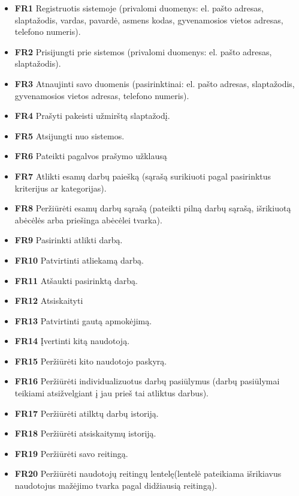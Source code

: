 \documentclass{VUMIFPSbakalaurinis}
\begin{document}
\begin{itemize}
	\item \textbf{FR1} Registruotis sistemoje (privalomi duomenys: el. pašto adresas, slaptažodis, vardas, pavardė, asmens kodas, gyvenamosios vietos adresas, telefono numeris).
	\item \textbf{FR2} Prisijungti prie sistemos (privalomi duomenys: el. pašto adresas, slaptažodis).
	\item \textbf{FR3} Atnaujinti savo duomenis (pasirinktinai: el. pašto adresas, slaptažodis, gyvenamosios vietos adresas, telefono numeris).
	\item \textbf{FR4} Prašyti pakeisti užmirštą slaptažodį.
	\item \textbf{FR5} Atsijungti nuo sistemos.
	\item \textbf{FR6} Pateikti pagalvos prašymo užklausą
	\item \textbf{FR7} Atlikti esamų darbų paiešką (sąrašą surikiuoti pagal pasirinktus kriterijus ar kategorijas).
	\item \textbf{FR8} Peržiūrėti esamų darbų sąrašą (pateikti pilną darbų sąrašą, išrikiuotą abėcėlės arba priešinga abėcėlei tvarka).
	\item \textbf{FR9} Pasirinkti atlikti darbą.
	\item \textbf{FR10} Patvirtinti atliekamą darbą.
	\item \textbf{FR11} Atšaukti pasirinktą darbą.
	\item \textbf{FR12} Atsiskaityti
	\item \textbf{FR13} Patvirtinti gautą apmokėjimą.
	\item \textbf{FR14} Įvertinti kitą naudotoją.
	\item \textbf{FR15} Peržiūrėti kito naudotojo paskyrą.
	\item \textbf{FR16} Peržiūrėti individualizuotus darbų pasiūlymus (darbų pasiūlymai teikiami atsižvelgiant į jau prieš tai atliktus darbus).
	\item \textbf{FR17} Peržiūrėti atilktų darbų istoriją.
	\item \textbf{FR18} Peržiūrėti atsiskaitymų istoriją.
	\item \textbf{FR19} Peržiūrėti savo reitingą.
	\item \textbf{FR20} Peržiūrėti naudotojų reitingų lentelę(lentelė pateikiama išrikiavus naudotojus mažėjimo tvarka pagal didžiausią reitingą).
\end{itemize}
\end{document}
